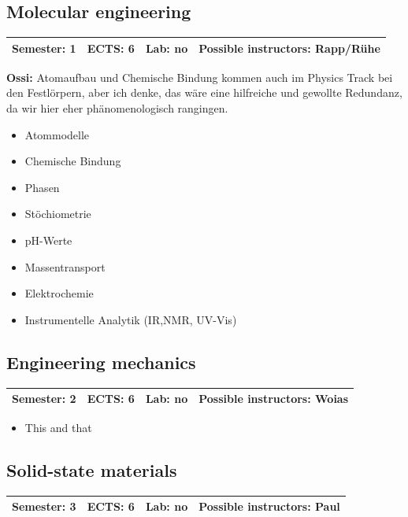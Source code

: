 \documentclass[12pt,twoside,fleqn,a4paper]{article}
\begin{document}
\subsection{Molecular engineering}
\begin{tabular}{llll} \hline
\textbf{Semester:} 1 & \textbf{ECTS:} 6 & \textbf{Lab:} no & \textbf{Possible instructors:} Rapp/Rühe\\
\hline
\end{tabular}



\textbf {Ossi:} Atomaufbau und Chemische Bindung kommen auch im Physics Track bei den Festlörpern, aber ich denke, das wäre eine hilfreiche und gewollte Redundanz, da wir hier eher phänomenologisch rangingen.



\begin{itemize}
\setlength\itemsep{0cm}


\item Atommodelle
\item Chemische Bindung
\item Phasen
\item Stöchiometrie
\item pH-Werte
\item Massentransport
\item Elektrochemie
\item Instrumentelle Analytik (IR,NMR, UV-Vis)
\end{itemize}


\subsection{Engineering mechanics}
\begin{tabular}{llll} \hline
\textbf{Semester:} 2 & \textbf{ECTS:} 6 & \textbf{Lab:} no & \textbf{Possible instructors:} Woias\\
\hline
\end{tabular}

\begin{itemize}
\setlength\itemsep{0cm}
\item This and that
\end{itemize}


\subsection{Solid-state materials}
\begin{tabular}{llll} \hline
\textbf{Semester:} 3 & \textbf{ECTS:} 6 & \textbf{Lab:} no & \textbf{Possible instructors:} Paul\\
\hline
\end{tabular}
\end{document}
